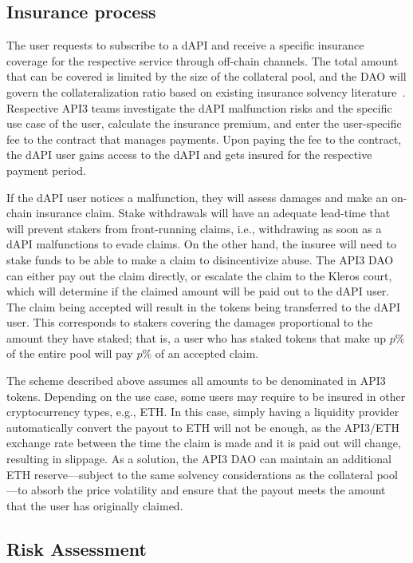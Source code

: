 \documentclass[11pt]{article}
\begin{document}
\subsection{Insurance process}
\label{sec:insurance-process}

The user requests to subscribe to a dAPI and receive a specific insurance coverage for the respective service through off-chain channels.
The total amount that can be covered is limited by the size of the collateral pool, and the DAO will govern the collateralization ratio based on existing insurance solvency literature~\cite{solvency}.
Respective API3 teams investigate the dAPI malfunction risks and the specific use case of the user, calculate the insurance premium, and enter the user-specific fee to the contract that manages payments.
Upon paying the fee to the contract, the dAPI user gains access to the dAPI and gets insured for the respective payment period.

If the dAPI user notices a malfunction, they will assess damages and make an on-chain insurance claim.
Stake withdrawals will have an adequate lead-time that will prevent stakers from front-running claims, i.e., withdrawing as soon as a dAPI malfunctions to evade claims.
On the other hand, the insuree will need to stake funds to be able to make a claim to disincentivize abuse.
The API3 DAO can either pay out the claim directly, or escalate the claim to the Kleros court, which will determine if the claimed amount will be paid out to the dAPI user.
The claim being accepted will result in the tokens being transferred to the dAPI user.
This corresponds to stakers covering the damages proportional to the amount they have staked; that is, a user who has staked tokens that make up $p\%$ of the entire pool will pay $p\%$ of an accepted claim.

The scheme described above assumes all amounts to be denominated in API3 tokens.
Depending on the use case, some users may require to be insured in other cryptocurrency types, e.g., ETH.
In this case, simply having a liquidity provider automatically convert the payout to ETH will not be enough, as the API3/ETH exchange rate between the time the claim is made and it is paid out will change, resulting in slippage.
As a solution, the API3 DAO can maintain an additional ETH reserve---subject to the same solvency considerations as the collateral pool---to absorb the price volatility and ensure that the payout meets the amount that the user has originally claimed.

\subsection{Risk Assessment}
\label{sec:risk-assessment}
\end{document}
